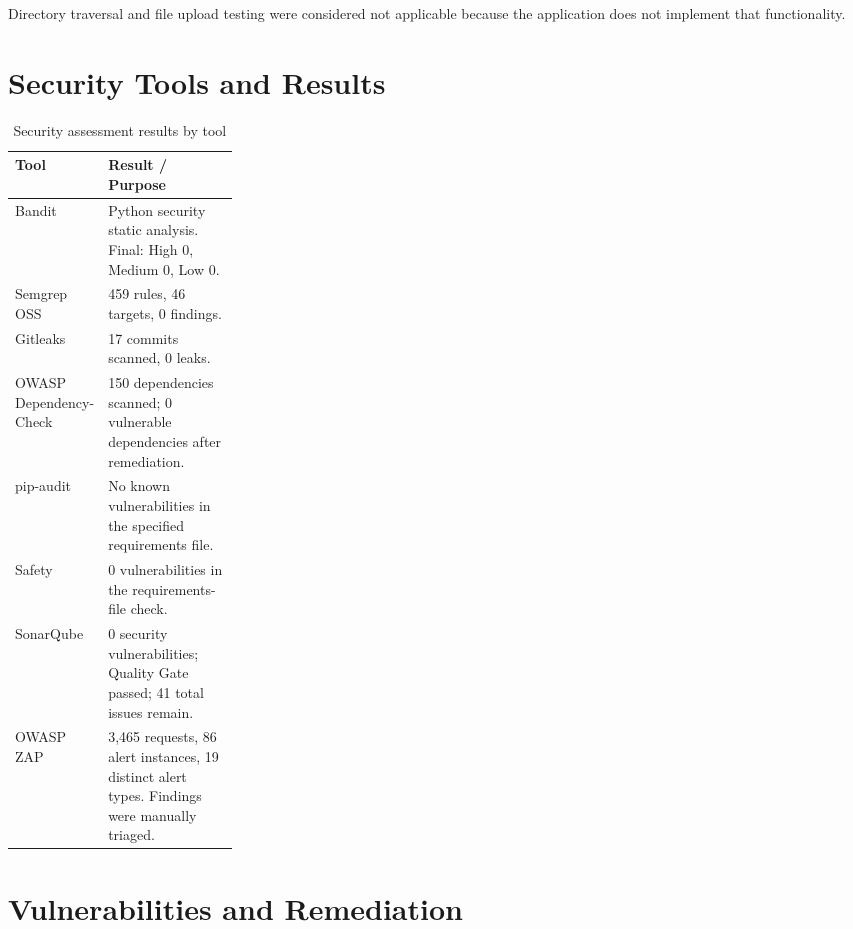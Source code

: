\documentclass[11pt,a4paper]{article}
\newcommand{\tablehead}{\rowcolor{LightBlue}}
\begin{document}
Directory traversal and file upload testing were considered not applicable because the application does not implement that functionality.

\section{Security Tools and Results}

\begin{table}[htbp]
\centering
\renewcommand{\arraystretch}{1.4}
\begin{tabularx}{\linewidth}{@{}L{0.26\linewidth}X@{}}
\toprule
\tablehead \textbf{Tool} & \textbf{Result / Purpose} \\
\midrule
Bandit & Python security static analysis. Final: High 0, Medium 0, Low 0. \\
Semgrep OSS & 459 rules, 46 targets, 0 findings. \\
Gitleaks & 17 commits scanned, 0 leaks. \\
OWASP Dependency-Check & 150 dependencies scanned; 0 vulnerable dependencies after remediation. \\
pip-audit & No known vulnerabilities in the specified requirements file. \\
Safety & 0 vulnerabilities in the requirements-file check. \\
SonarQube & 0 security vulnerabilities; Quality Gate passed; 41 total issues remain. \\
OWASP ZAP & 3,465 requests, 86 alert instances, 19 distinct alert types. Findings were manually triaged. \\
\bottomrule
\end{tabularx}
\caption{Security assessment results by tool}
\end{table}

\section{Vulnerabilities and Remediation}
\end{document}
